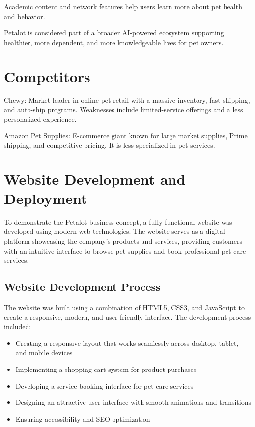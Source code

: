 \documentclass[11pt,a4paper]{article}
\begin{document}
Academic content and network features help users learn more about pet health and behavior.

Petalot is considered part of a broader AI-powered ecosystem supporting healthier, more dependent, and more knowledgeable lives for pet owners.

\section{Competitors}

Chewy: Market leader in online pet retail with a massive inventory, fast shipping, and auto-ship programs. Weaknesses include limited-service offerings and a less personalized experience.

Amazon Pet Supplies: E-commerce giant known for large market supplies, Prime shipping, and competitive pricing. It is less specialized in pet services.

\section{Website Development and Deployment}

To demonstrate the Petalot business concept, a fully functional website was developed using modern web technologies. The website serves as a digital platform showcasing the company's products and services, providing customers with an intuitive interface to browse pet supplies and book professional pet care services.

\subsection{Website Development Process}

The website was built using a combination of HTML5, CSS3, and JavaScript to create a responsive, modern, and user-friendly interface. The development process included:

\begin{itemize}
    \item Creating a responsive layout that works seamlessly across desktop, tablet, and mobile devices
    \item Implementing a shopping cart system for product purchases
    \item Developing a service booking interface for pet care services
    \item Designing an attractive user interface with smooth animations and transitions
    \item Ensuring accessibility and SEO optimization
\end{itemize}
\end{document}
